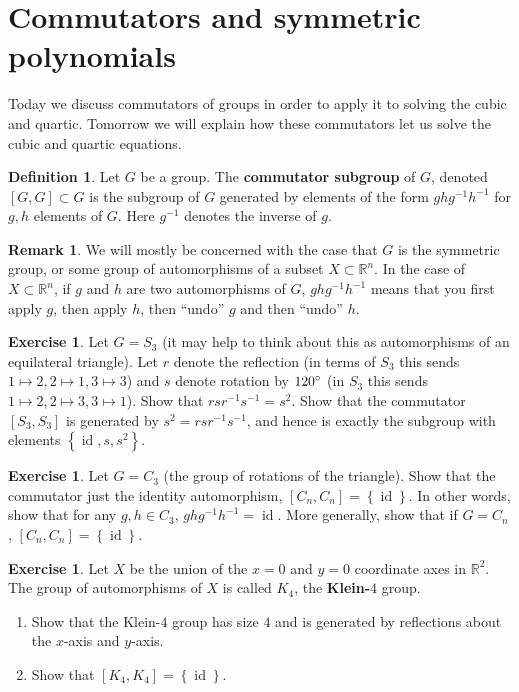 \documentclass[reqno, 12pt, letter]{article}
\theoremstyle{plain}
\theoremstyle{definition}
\newtheorem{definition}[theorem]{Definition}
\newtheorem{remark}[theorem]{Remark}
\newtheorem{exercise}[theorem]{Exercise}
\theoremstyle{remark}
\numberwithin{equation}{section}
\newcommand\br{{\mathbb R}}
\DeclareMathOperator\id{id}
\begin{document}
\newpage
\section{Commutators and symmetric polynomials}
Today we discuss commutators of groups in order to apply it to solving the cubic and quartic.
Tomorrow we will explain how these commutators let us solve the cubic and quartic equations.
\begin{definition}
	\label{definition:}
	Let $G$ be a group. The {\bf commutator subgroup} of $G$, denoted $\left[ G,G \right] \subset G$ is the subgroup of $G$ generated
	by elements of the form $ghg^{-1}h^{-1}$ for $g, h$ elements of $G$.
	Here $g^{-1}$ denotes the inverse of $g$.
\end{definition}
\begin{remark}
	\label{remark:}
	We will mostly be concerned with the case that $G$ is the symmetric group, or some group of automorphisms of a subset $X \subset \br^n$.
	In the case of $X \subset \br^n$, if $g$ and $h$ are two automorphisms of $G$, $ghg^{-1}h^{-1}$ means that you first apply $g$, then apply $h$, then
	``undo'' $g$ and then ``undo'' $h$.
\end{remark}
\begin{exercise}
	\label{exercise:}
	Let $G = S_3$ (it may help to think about this as automorphisms of an equilateral triangle).
	Let $r$ denote the reflection (in terms of $S_3$ this sends $1 \mapsto 2, 2 \mapsto 1, 3\mapsto 3$)
	and $s$ denote rotation by $120 \degree$ (in $S_3$ this sends $1 \mapsto 2, 2 \mapsto 3, 3 \mapsto 1$).
	Show that $rsr^{-1}s^{-1} = s^2$.
	Show that the commutator $\left[ S_3, S_3 \right]$ is generated by $s^2 = rsr^{-1}s^{-1}$, and hence is exactly the subgroup
	with elements $\left\{ \id, s, s^2 \right\}$.
\end{exercise}
\begin{exercise}
	\label{exercise:}
	Let $G = C_3$ (the group of rotations of the triangle). Show that the commutator just the identity automorphism, $\left[ C_n, C_n \right] = \left\{ \id \right\}$.
	In other words, show that for any $g, h \in C_3$, $ghg^{-1}h^{-1} = \id$.
	More generally, show that if $G = C_n$, $\left[ C_n, C_n \right] = \left\{ \id \right\}$.
\end{exercise}

\begin{exercise}
	\label{exercise:klein-4}
	Let $X$ be the union of the $x = 0$ and $y = 0$ coordinate axes in $\br^2$. The group of automorphisms of $X$ is called $K_4$, the {\bf Klein-$4$} group.
	\begin{enumerate}
		\item Show that the Klein-$4$ group has size $4$ and is generated by reflections about the $x$-axis and $y$-axis.
		\item Show that $\left[ K_4, K_4 \right] = \left\{ \id \right\}$.
	\end{enumerate}
\end{exercise}
\end{document}
